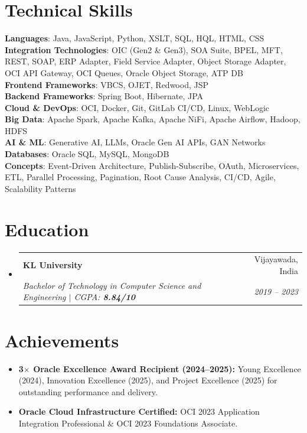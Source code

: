 \documentclass[letterpaper,11pt]{article}
\makeatletter
\newcommand{\resumeItem}[1]{
  \item\small{
    {#1 \vspace{-2pt}}
  }
}
\newcommand{\resumeSubheading}[4]{
  \vspace{-2pt}\item
    \begin{tabular*}{0.97\textwidth}[t]{l@{\extracolsep{\fill}}r}
      \textbf{#1} & #2 \\
      \textit{\small#3} & \textit{\small #4} \\
    \end{tabular*}\vspace{-7pt}
}
\newcommand{\resumeSubHeadingListStart}{\begin{itemize}[leftmargin=0.15in, label={}]}
\newcommand{\resumeSubHeadingListEnd}{\end{itemize}}
\newcommand{\resumeItemListStart}{\begin{itemize}}
\newcommand{\resumeItemListEnd}{\end{itemize}\vspace{-5pt}}
\makeatother
\begin{document}
\section{Technical Skills}
\begin{itemize}[leftmargin=0.15in, label={}]
    \small{\item{
        \textbf{Languages}{: Java, JavaScript, Python, XSLT, SQL, HQL, HTML, CSS} \\
        \textbf{Integration Technologies}{: OIC (Gen2 \& Gen3), SOA Suite, BPEL, MFT, REST, SOAP, ERP Adapter, Field Service Adapter, Object Storage Adapter, OCI API Gateway, OCI Queues, Oracle Object Storage, ATP DB} \\
        \textbf{Frontend Frameworks}{: VBCS, OJET, Redwood, JSP} \\
        \textbf{Backend Frameworks}{: Spring Boot, Hibernate, JPA} \\
        \textbf{Cloud \& DevOps}{: OCI, Docker, Git, GitLab CI/CD, Linux, WebLogic} \\
        \textbf{Big Data}{: Apache Spark, Apache Kafka, Apache NiFi, Apache Airflow, Hadoop, HDFS} \\
        \textbf{AI \& ML}{: Generative AI, LLMs, Oracle Gen AI APIs, GAN Networks} \\
        \textbf{Databases}{: Oracle SQL, MySQL, MongoDB} \\
        \textbf{Concepts}{: Event-Driven Architecture, Publish-Subscribe, OAuth, Microservices, ETL, Parallel Processing, Pagination, Root Cause Analysis, CI/CD, Agile, Scalability Patterns}
    }}
\end{itemize}

\vspace{-6pt}

\section{Education}
\resumeSubHeadingListStart
    \resumeSubheading
        {KL University}{Vijayawada, India}
        {Bachelor of Technology in Computer Science and Engineering $|$ CGPA: \textbf{8.84/10}}{2019 -- 2023}
\resumeSubHeadingListEnd

\vspace{-6pt}

\section{Achievements}
\resumeItemListStart
    \resumeItem{\textbf{3$\times$ Oracle Excellence Award Recipient (2024--2025):} Young Excellence (2024), Innovation Excellence (2025), and Project Excellence (2025) for outstanding performance and delivery.}
    \resumeItem{\textbf{Oracle Cloud Infrastructure Certified:} OCI 2023 Application Integration Professional \& OCI 2023 Foundations Associate.}
\resumeItemListEnd
\end{document}
